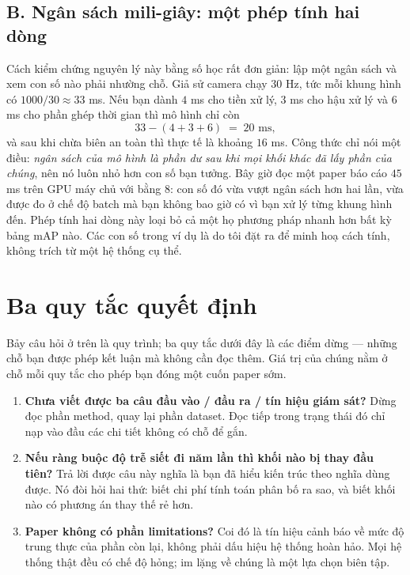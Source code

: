 \documentclass[../../deep_learning.tex]{subfiles}
\begin{document}
\subsection{B. Ngân sách mili-giây: một phép tính hai dòng}
Cách kiểm chứng nguyên lý này bằng số học rất đơn giản: lập một ngân sách và xem con số nào phải nhường chỗ. Giả sử camera chạy \(30\) Hz, tức mỗi khung hình có \(1000/30 \approx 33\) ms. Nếu bạn dành \(4\) ms cho tiền xử lý, \(3\) ms cho hậu xử lý và \(6\) ms cho phần ghép thời gian thì mô hình chỉ còn
\[
33 - (4+3+6) \;=\; 20 \text{ ms},
\]
và sau khi chừa biên an toàn thì thực tế là khoảng \(16\) ms. Công thức chỉ nói một điều: \emph{ngân sách của mô hình là phần dư sau khi mọi khối khác đã lấy phần của chúng}, nên nó luôn nhỏ hơn con số bạn tưởng. Bây giờ đọc một paper báo cáo \(45\) ms trên GPU máy chủ với  bằng \(8\): con số đó vừa vượt ngân sách hơn hai lần, vừa được đo ở chế độ batch mà bạn không bao giờ có vì bạn xử lý từng khung hình đến. Phép tính hai dòng này loại bỏ cả một họ phương pháp nhanh hơn bất kỳ bảng mAP nào. Các con số trong ví dụ là do tôi đặt ra để minh hoạ cách tính, không trích từ một hệ thống cụ thể. 

\section{Ba quy tắc quyết định}
Bảy câu hỏi ở trên là quy trình; ba quy tắc dưới đây là các điểm dừng --- những chỗ bạn được phép kết luận mà không cần đọc thêm. Giá trị của chúng nằm ở chỗ mỗi quy tắc cho phép bạn đóng một cuốn paper sớm.

\begin{enumerate}
\item \textbf{Chưa viết được ba câu đầu vào / đầu ra / tín hiệu giám sát?} Dừng đọc phần method, quay lại phần dataset. Đọc tiếp trong trạng thái đó chỉ nạp vào đầu các chi tiết không có chỗ để gắn.
\item \textbf{Nếu ràng buộc độ trễ siết đi năm lần thì khối nào bị thay đầu tiên?} Trả lời được câu này nghĩa là bạn đã hiểu kiến trúc theo nghĩa dùng được. Nó đòi hỏi hai thứ: biết chi phí tính toán phân bố ra sao, và biết khối nào có phương án thay thế rẻ hơn.
\item \textbf{Paper không có phần limitations?} Coi đó là tín hiệu cảnh báo về mức độ trung thực của phần còn lại, không phải dấu hiệu hệ thống hoàn hảo. Mọi hệ thống thật đều có chế độ hỏng; im lặng về chúng là một lựa chọn biên tập.
\end{enumerate}
\end{document}

